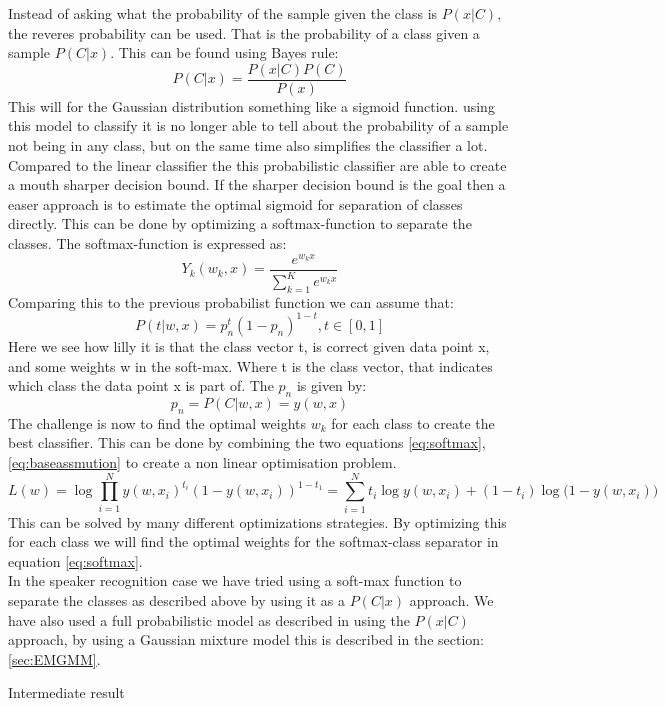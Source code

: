 Instead of asking what the probability of the sample given the class is $P(x|C)$, the reveres probability can be used. That is the probability of a class given a sample $P(C|x)$. This can be found using Bayes rule:
\begin{equation}
 P(C|x)=\frac{P(x|C)P(C)}{P(x)}
\end{equation}
This will for the Gaussian distribution something like a sigmoid function. using this model to classify it is no longer able to tell about the probability of a sample not being in any class, but on the same time also simplifies the classifier a lot. Compared to the linear classifier the this probabilistic classifier are able to create a mouth sharper decision bound. If the sharper decision bound is the goal then a easer approach is to estimate the optimal sigmoid for separation of classes directly. This can be done by optimizing a softmax-function to separate the classes. The softmax-function is expressed as: 
\begin{equation}
\label{eq:softmax}
 Y_k(w_k,x)=\frac{e^{w_k x}}{\sum\limits_{k=1}^K e^{w_k x}}
\end{equation}
Comparing this to the previous probabilist function we can assume that:
\begin{equation}
\label{eq:baseassmution}
 P(t|w,x) = p_n^t (1-p_n)^{1-t} , t \in [0,1] 
\end{equation}
Here we see how lilly it is that the class vector t, is correct given data point x, and some weights w in the soft-max.  Where t is the class vector, that indicates which class the data point x is part of.  The $p_n$ is given by: 
\begin{equation}
 p_n = P(C| w, x) = y(w,x)
\end{equation}
The challenge is now to find the optimal weights $w_k$ for each class to create the best classifier. This can be done by combining the two equations \ref{eq:softmax}, \ref{eq:baseassmution} to create a non linear optimisation problem.
\begin{equation}
 L(w) = \log{\prod\limits_{i=1}^N y(w,x_i)^{t_i} ( 1-y(w,x_i))^{1-t_1}}
 = \sum\limits_{i=1}^N t_i\log{y(w,x_i)}+(1-t_i)\log({1-y(w,x_i))}
\end{equation}
This can be solved by many different optimizations strategies. By optimizing this for each class we will find the optimal weights for the softmax-class separator in equation \ref{eq:softmax}.\\

In the speaker recognition case we have tried using a soft-max function to separate the classes as described above by using it as a $P(C|x)$ approach. We have also used a full probabilistic model as described in using the $P(x|C)$ approach, by using a Gaussian mixture model this is described in the section: \ref{sec:EMGMM}. 


Intermediate result\\


